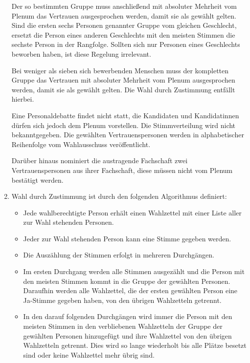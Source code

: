\documentclass[12pt,oneside]{scrartcl}
\begin{document}
\begin{enumerate}
Der so bestimmten Gruppe muss anschließend mit absoluter Mehrheit vom
Plenum das Vertrauen ausgesprochen werden, damit sie als gewählt gelten.
Sind die ersten sechs Personen genannter Gruppe vom gleichen Geschlecht,
ersetzt die Person eines anderen Geschlechts mit den meisten Stimmen die
sechste Person in der Rangfolge.
Sollten sich nur Personen eines Geschlechts beworben haben, ist diese
Regelung irrelevant.

Bei weniger als sieben sich bewerbenden Menschen muss der kompletten Gruppe
das Vertrauen mit absoluter Mehrheit vom Plenum ausgesprochen werden,
damit sie als gewählt gelten.
Die Wahl durch Zustimmung entfällt hierbei.

Eine Personaldebatte findet nicht statt, die Kandidaten und Kandidatinnen
dürfen sich jedoch dem Plenum vorstellen.
Die Stimmverteilung wird nicht bekanntgegeben.
Die gewählten Vertrauenspersonen werden in alphabetischer Reihenfolge
vom Wahlausschuss veröffentlicht.

Darüber hinaus nominiert die austragende Fachschaft zwei Vertrauenspersonen
aus ihrer Fachschaft, diese müssen nicht vom Plenum bestätigt werden.

\item Wahl durch Zustimmung ist durch den folgenden Algorithmus definiert:

\begin{itemize}
\item Jede wahlberechtigte Person erhält einen Wahlzettel mit einer
Liste aller zur Wahl stehenden Personen.

\item Jeder zur Wahl stehenden Person kann eine Stimme gegeben werden.

\item Die Auszählung der Stimmen erfolgt in mehreren Durchgängen.

\item Im ersten Durchgang werden alle Stimmen ausgezählt und die Person
mit den meisten Stimmen kommt in die Gruppe der gewählten Personen.
Daraufhin werden alle Wahlzettel, die der ersten gewählten Person
eine Ja-Stimme gegeben haben, von den übrigen Wahlzetteln getrennt.

\item In den darauf folgenden Durchgängen wird immer die Person mit den
meisten Stimmen in den verbliebenen Wahlzetteln der Gruppe der gewählten
Personen hinzugefügt und ihre Wahlzettel von den übrigen Wahlzetteln
getrennt. Dies wird so lange wiederholt bis alle Plätze besetzt sind
oder keine Wahlzettel mehr übrig sind.


\end{itemize}
\end{enumerate}
\end{document}
